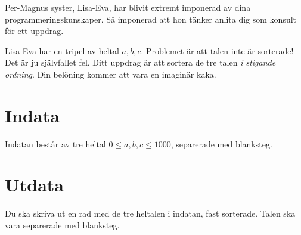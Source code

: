
Per-Magnus syster, Lisa-Eva, har blivit extremt imponerad av dina programmeringskunskaper.
Så imponerad att hon tänker anlita dig som konsult för ett uppdrag.

Lisa-Eva har en tripel av heltal $a, b, c$.
Problemet är att talen inte är sorterade!
Det är ju självfallet fel.
Ditt uppdrag är att sortera de tre talen \emph{i stigande ordning}.
Din belöning kommer att vara en imaginär kaka.

\section*{Indata}
Indatan består av tre heltal $0 \le a, b, c \le 1000$, separerade med blanksteg.

\section*{Utdata}
Du ska skriva ut en rad med de tre heltalen i indatan, fast sorterade. Talen ska vara separerade med blanksteg.

